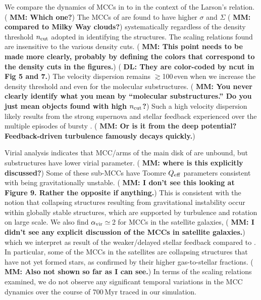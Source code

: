 \IfFileExists{emulateapjlegacy.cls}{\documentclass[iop]{emulateapjlegacy}}{\documentclass[iop]{emulateapj}}
\newcommand{\DL}[1]{({\bf \color{dlcolor} DL: #1})}
\newcommand{\MM}[1]{({\bf \color{mmcolor} MM: #1})}
\begin{document}
We compare the dynamics of MCCs in \flower to \obs in the context of
the Larson's relation. \MM{Which one?}
The MCCs of \flower are found to have higher $\sigma$ and $\Sigma$
\MM{compared to Milky Way clouds?}
systematically regardless of the 
density threshold $n_{\rm cut}$ adopted in identifying the structures.
The scaling relations found are insensitive to the various density
cuts.  \MM{This point needs to be made more clearly, probably by
  defining the colors that correspond to the density cuts in the figures.} \DL{They are color-coded by ncut in Fig 5 and 7.}
 The velocity dispersion remains $\gtrsim$100\,\kms even when we increase the density threshold and 
 even for the molecular substructures.  \MM{You never clearly identify
   what you mean by ``molecular substructures.''  Do you just mean
   objects found with high $n_{\rm cut}$?}
 Such a high velocity dispersion likely results from the strong supernova and stellar feedback \flower experienced 
 over the multiple episodes of bursty \SF.   \MM{Or is it from the
   deep potential?  Feedback-driven turbulence famously decays quickly.}

Virial analysis indicates that MCC/arms of the main disk of \flower are unbound, but substructures have
lower virial parameter.
\MM{where is this explicitly discussed?}
 Some of these sub-MCCs have Toomre $Q_{\rm eff}$ parameters consistent with being
gravitationally unstable.  \MM{I don't see this looking at Figure 9.
  Rather the opposite if anything.} This is consistent with the notion that collapsing structures resulting from
gravitational instability occur within globally stable structures, which are
supported by turbulence and rotation on large scale.
We also find $\alpha_{\rm vir}\simeq$\,2 for MCCs in the satellite
galaxies, \MM{I didn't see any explicit discussion of the MCCs in
  satellite galaxies.} which we interpret as
result of the weaker/delayed stellar feedback compared to \flower. 
In particular, some of the MCCs in the satellites are collapsing structures that have not yet formed stars, as confirmed by their
higher gas-to-stellar fractions. \MM{Also not shown so far as I can see.}
In terms of the scaling relations examined, we do not observe any significant
temporal variations in the MCC dynamics over the course of 700\,Myr
traced in our simulation. 
\end{document}
